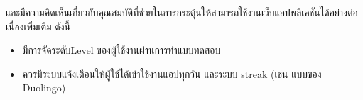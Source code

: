 \documentclass[12pt,oneside,openright,a4paper]{cpe-thai-project}
\begin{document}
และมีความคิดเห็นเกี่ยวกับคุณสมบัติที่ช่วยในการกระตุ้นให้สามารถใช้งานเว็บแอปพลิเคชั่นได้อย่างต่อเนื่องเพิ่มเติม ดังนี้
\begin{itemize}
	\item มีการจัดระดับLevel ของผู้ใช้งานผ่านการทำแบบทดสอบ
	\item ควรมีระบบแจ้งเตือนให้ผู้ใช้ได้เข้าใช้งานแอปทุกวัน และระบบ streak (เช่น แบบของ Duolingo)
\end{itemize}






\end{document}
